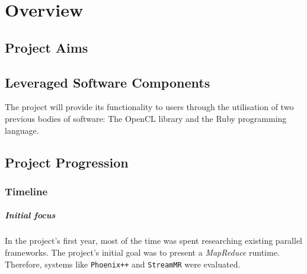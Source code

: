 \chapter{Overview}

\section{Project Aims}


\section{Leveraged Software Components}
The project will provide its functionality to users through the utilisation of two previous bodies of software: The \ac{OpenCL} library and the Ruby programming language.





\section{Project Progression}
\subsection{Timeline}
\paragraph*{Initial focus}
In the project's first year, most of the time was spent researching existing parallel frameworks. The project's initial goal was to present a \emph{MapReduce} runtime. Therefore, systems like \verb|Phoenix++|\cite{phoenix++} and \verb|StreamMR|\cite{streammr} were evaluated.

